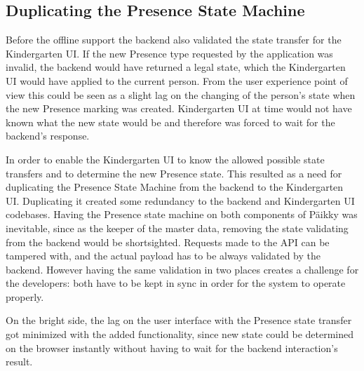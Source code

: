 \subsection{Duplicating the Presence State Machine}

Before the offline support the backend also validated the state transfer for the Kindergarten UI. If the new Presence type requested by the application was invalid, the backend would have returned a legal state, which the Kindergarten UI would have applied to the current person. From the user experience point of view this could be seen as a slight lag on the changing of the person's state when the new Presence marking was created. Kindergarten UI at time would not have known what the new state would be and therefore was forced to wait for the backend's response. 


In order to enable the Kindergarten UI to know the allowed possible state transfers and to determine the new Presence state. This resulted as a need for duplicating the Presence State Machine from the backend to the Kindergarten UI. Duplicating it created some redundancy to the backend and Kindergarten UI codebases. Having the Presence state machine on both components of Päikky was inevitable, since as the keeper of the master data, removing the state validating from the backend would be shortsighted. Requests made to the API can be tampered with, and the actual payload has to be always validated by the backend. However having the same validation in two places creates a challenge for the developers: both have to be kept in sync in order for the system to operate properly. 

On the bright side, the lag on the user interface with the Presence state transfer got minimized with the added functionality, since new state could be determined on the browser instantly without having to wait for the backend interaction's result.




















